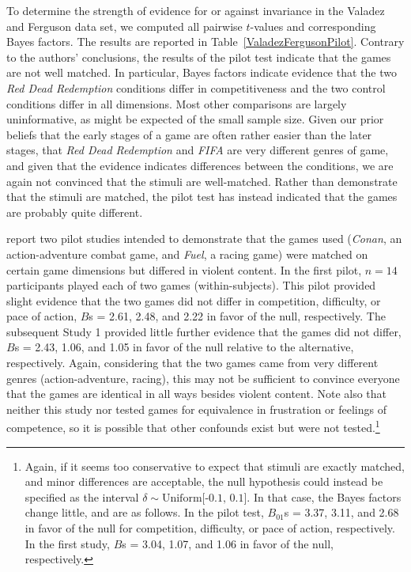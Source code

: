 \documentclass[man]{apa6}
\begin{document}
To determine the strength of evidence for or against invariance in the Valadez and Ferguson data set, we computed all pairwise $t$-values and corresponding Bayes factors.  The results are reported in Table~\ref{ValadezFergusonPilot}. Contrary to the authors' conclusions, the results of the pilot test indicate that the games are not well matched. In particular, Bayes factors indicate evidence that the two {\em Red Dead Redemption} conditions differ in competitiveness and the two control conditions differ in all dimensions. Most other comparisons are largely uninformative, as might be expected of the small sample size. Given our prior beliefs that the early stages of a game are often rather easier than the later stages, that {\em Red Dead Redemption} and {\em FIFA} are very different genres of game, and given that the evidence indicates differences between the conditions, we are again not convinced that the stimuli are well-matched. Rather than demonstrate that the stimuli are matched, the pilot test has instead indicated that the games are probably quite different.

\citet{Adachi:Willoughby:2011} report two pilot studies intended to demonstrate that the games used ({\em Conan}, an action-adventure combat game, and {\em Fuel}, a racing game) were matched on certain game dimensions but differed in violent content. In the first pilot, $n = 14$ participants played each of two games (within-subjects). This pilot provided slight evidence that the two games did not differ in competition, difficulty, or pace of action, $B$s = 2.61, 2.48, and 2.22 in favor of the null, respectively. The subsequent Study 1 provided little further evidence that the games did not differ, $B$s = 2.43, 1.06, and 1.05 in favor of the null relative to the alternative, respectively. Again, considering that the two games came from very different genres (action-adventure, racing), this may not be sufficient to convince everyone that the games are identical in all ways besides violent content. Note also that neither this study nor \citet{Valadez:Ferguson:2012} tested games for equivalence in frustration or feelings of competence, so it is possible that other confounds exist but were not tested.\footnote{Again, if it seems too conservative to expect that stimuli are exactly matched, and minor differences are acceptable, the null hypothesis could instead be specified as the interval $\delta \sim \mbox{Uniform[-0.1, 0.1]}$. In that case, the Bayes factors change little, and are as follows. In the pilot test, $B_{01}$s = 3.37, 3.11, and 2.68 in favor of the null for competition, difficulty, or pace of action, respectively. In the first study, $B$s = 3.04, 1.07, and 1.06 in favor of the null, respectively.}
\end{document}

